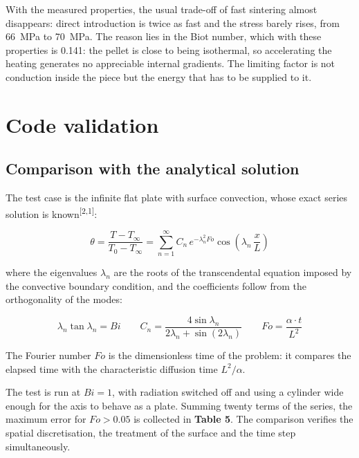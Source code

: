 \documentclass[11pt,a4paper]{article}
\newcommand{\cita}[1]{\textsuperscript{[\textcolor{uji}{#1}]}}
\newcommand{\tab}[1]{\textbf{\textcolor{uji}{Table #1}}}
\begin{document}
With the measured properties, the usual trade-off of fast sintering almost
disappears: direct introduction is twice as fast and the stress barely
rises, from \SI{66}{\mega\pascal} to \SI{70}{\mega\pascal}. The reason lies
in the Biot number, which with these properties is \num{0.141}: the pellet
is close to being isothermal, so accelerating the heating generates no
appreciable internal gradients. The limiting factor is not conduction
inside the piece but the energy that has to be supplied to it.

\section{Code validation}

\subsection{Comparison with the analytical solution}

The test case is the infinite flat plate with surface convection, whose
exact series solution is known\cita{2,1}:

\begin{equation}
\theta = \frac{T - T_{\infty}}{T_{0} - T_{\infty}}
= \sum_{n=1}^{\infty} C_{n}\, e^{-\lambda_{n}^{2} Fo}
  \cos\left( \lambda_{n}\, \frac{x}{L} \right)
\end{equation}

where the eigenvalues $\lambda_{n}$ are the roots of the transcendental
equation imposed by the convective boundary condition, and the coefficients
follow from the orthogonality of the modes:

\begin{equation}
\lambda_{n} \tan \lambda_{n} = Bi
\qquad
C_{n} = \frac{4 \sin \lambda_{n}}
             {2 \lambda_{n} + \sin\left( 2 \lambda_{n} \right)}
\qquad
Fo = \frac{\alpha \cdot t}{L^{2}}
\end{equation}

The Fourier number $Fo$ is the dimensionless time of the problem: it
compares the elapsed time with the characteristic diffusion time
$L^{2}/\alpha$.

The test is run at $Bi = 1$, with radiation switched off and using a
cylinder wide enough for the axis to behave as a plate. Summing twenty
terms of the series, the maximum error for $Fo > \num{0.05}$ is collected
in \tab{5}. The comparison verifies the spatial discretisation, the
treatment of the surface and the time step simultaneously.
\end{document}
